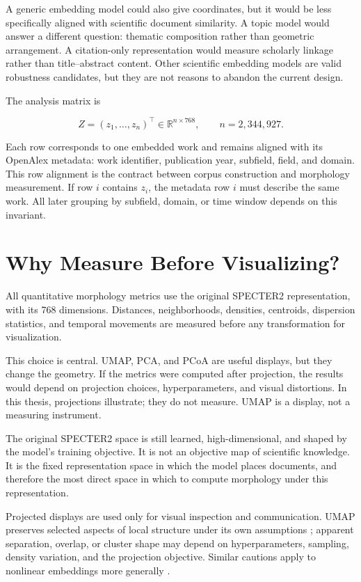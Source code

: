 A generic embedding model could also give coordinates, but it would be less specifically aligned with scientific document similarity. A topic model would answer a different question: thematic composition rather than geometric arrangement. A citation-only representation would measure scholarly linkage rather than title--abstract content. Other scientific embedding models are valid robustness candidates, but they are not reasons to abandon the current design.

The analysis matrix is

\[
Z = (z_1, \ldots, z_n)^\top \in \mathbb{R}^{n \times 768},
\qquad n = 2{,}344{,}927.
\]

Each row corresponds to one embedded work and remains aligned with its OpenAlex metadata: work identifier, publication year, subfield, field, and domain. This row alignment is the contract between corpus construction and morphology measurement. If row \(i\) contains \(z_i\), the metadata row \(i\) must describe the same work. All later grouping by subfield, domain, or time window depends on this invariant.

\section{Why Measure Before Visualizing?}

All quantitative morphology metrics use the original SPECTER2 representation, with its 768 dimensions. Distances, neighborhoods, densities, centroids, dispersion statistics, and temporal movements are measured before any transformation for visualization.

This choice is central. UMAP, PCA, and PCoA are useful displays, but they change the geometry. If the metrics were computed after projection, the results would depend on projection choices, hyperparameters, and visual distortions. In this thesis, projections illustrate; they do not measure. UMAP is a display, not a measuring instrument.

The original SPECTER2 space is still learned, high-dimensional, and shaped by the model's training objective. It is not an objective map of scientific knowledge. It is the fixed representation space in which the model places documents, and therefore the most direct space in which to compute morphology under this representation.

Projected displays are used only for visual inspection and communication. UMAP preserves selected aspects of local structure under its own assumptions \parencite{mcinnes2018umap}; apparent separation, overlap, or cluster shape may depend on hyperparameters, sampling, density variation, and the projection objective. Similar cautions apply to nonlinear embeddings more generally \parencite{chari2023specious,wattenberg2016tsne}.

